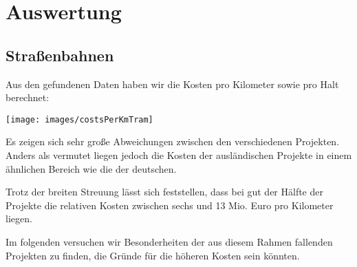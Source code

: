 \chapter{Auswertung}



\section{Straßenbahnen}

Aus den gefundenen Daten haben wir die Kosten pro Kilometer sowie pro Halt berechnet:

\nopagebreak

\texttt{[image: images/costsPerKmTram]}

Es zeigen sich sehr große Abweichungen zwischen den verschiedenen Projekten. Anders als vermutet liegen jedoch die Kosten der ausländischen Projekte in einem ähnlichen Bereich wie die der deutschen.

Trotz der breiten Streuung lässt sich feststellen, dass bei gut der Hälfte der Projekte die relativen Kosten zwischen sechs und 13 Mio. Euro pro Kilometer liegen.

Im folgenden versuchen wir Besonderheiten der aus diesem Rahmen fallenden Projekten zu finden, die Gründe für die höheren Kosten sein könnten.

